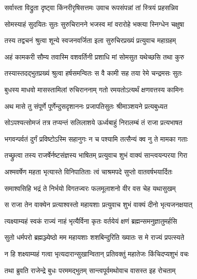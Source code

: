 \twolineshloka
{सर्वास्ता विद्रुता दृष्ट्वा किंनरीरृषिसत्तमः}
{उवाच रूपसंपन्नां तां स्त्रियं प्रहसन्निव} %

\twolineshloka
{सोमस्याहं सुदयितः सुतः सुरुचिरानने}
{भजस्व मां वरारोहे भक्त्या स्निग्धेन चक्षुषा} %

\twolineshloka
{तस्य तद्वचनं श्रुत्वा शून्ये स्वजनवर्जिता}
{इला सुरुचिरप्रख्यं प्रत्युवाच महाग्रहम्} %

\twolineshloka
{अहं कामकरी सौम्य तवास्मि वशवर्तिनी}
{प्रशाधि मां सोमसुत यथेच्छसि तथा कुरु} %

\twolineshloka
{तस्यास्तदद्भुतप्रख्यं श्रुत्वा हर्षसमन्वितः}
{स वै कामी सह तया रेमे चन्द्रमसः सुतः} %

\twolineshloka
{बुधस्य माधवो मासस्तामिलां रुचिराननाम्}
{गतो रमयतोऽत्यर्थं क्षणवत्तस्य कामिनः} %

\twolineshloka
{अथ मासे तु संपूर्णे पूर्णेन्दुसदृशाननः}
{प्रजापतिसुतः श्रीमाञ्शयने प्रत्यबुध्यत} %

\twolineshloka
{सोऽपश्यत्सोमजं तत्र तप्यन्तं सलिलाशये}
{ऊर्ध्वबाहुं निरालम्बं तं राजा प्रत्यभाषत} %

\twolineshloka
{भगवन्पर्वतं दुर्गं प्रविष्टोऽस्मि सहानुगः}
{न च पश्यामि तत्सैन्यं क्व नु ते मामका गताः} %

\twolineshloka
{तच्छ्रुत्वा तस्य राजर्षेर्नष्टसंज्ञस्य भाषितम्}
{प्रत्युवाच शुभं वाक्यं सान्त्वयन्परया गिरा} %

\twolineshloka
{अश्मवर्षेण महता भृत्यास्ते विनिपातिताः}
{त्वं चाश्रमपदे सुप्तो वातवर्षभयार्दितः} %

\twolineshloka
{समाश्वसिहि भद्रं ते निर्भयो विगतज्वरः}
{फलमूलाशनो वीर वस चेह यथासुखम्} %

\twolineshloka
{स राजा तेन वाक्येन प्रत्याश्वस्तो महायशाः}
{प्रत्युवाच शुभं वाक्यं दीनो भृत्यजनक्षयात्} %

\twolineshloka
{त्यक्ष्याम्यहं स्वकं राज्यं नाहं भृत्यैर्विना कृतः}
{वर्तयेयं क्षणं ब्रह्मन्समनुज्ञातुमर्हसि} %

\twolineshloka
{सुतो धर्मपरो ब्रह्मञ्ज्येष्ठो मम महायशाः}
{शशबिन्दुरिति ख्यातः स मे राज्यं प्रपत्स्यते} %

\twolineshloka
{न हि शक्ष्याम्यहं गत्वा भृत्यदारान्सुखान्वितान्}
{प्रतिवक्तुं महातेजः किंचिदप्यशुभं वचः} %

\twolineshloka
{तथा ब्रुवति राजेन्द्रे बुधः परममद्भुतम्}
{सान्त्वपूर्वमथोवाच वासस्त इह रोचताम्} %

